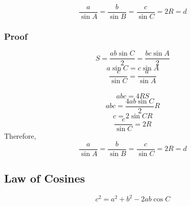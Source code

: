 \documentclass{article}
\begin{document}
$$\frac{a}{\sin A}=\frac{b}{\sin B}=\frac{c}{\sin C}=2R=d$$

\subsubsection{Proof}
$$S=\frac{ab\sin C}{2}=\frac{bc\sin A}{2}$$
$$a\sin C=c\sin A$$
$$\frac{c}{\sin C}=\frac{a}{\sin A}$$\\

$$abc=4RS$$
$$abc=\frac{4ab\sin C}{2}R$$
$$c=2\sin CR$$
$$\frac{c}{\sin C}=2R$$
Therefore, 
$$\frac{a}{\sin A}=\frac{b}{\sin B}=\frac{c}{\sin C}=2R=d$$

\subsection{Law of Cosines}
$$c^2=a^2+b^2-2 a b \cos C $$
\end{document}
